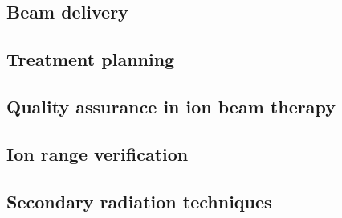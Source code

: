 

\subsection{Beam delivery}\label{chap1::subsec::beamDelivery}

\subsection{Treatment planning}\label{chap1::subsec::treatmentPlan}

\subsection{Quality assurance in ion beam therapy}\label{chap1::subsec::IonQA}

\subsection{Ion range verification}\label{chap1::subsec::rangeVer}

\subsection{Secondary radiation techniques}\label{chap1::subsec::secondaryRad}

